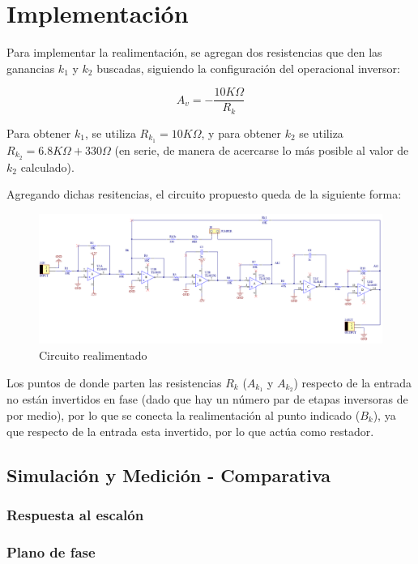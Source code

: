 \documentclass{article}
\begin{document}
\section{Implementación}

Para implementar la realimentación, se agregan dos resistencias que den las ganancias $k_1$ y $k_2$ buscadas, siguiendo la configuración del operacional inversor:

\[
A_v = -\frac{10K\Omega}{R_k} 
\] 

Para obtener $k_1$, se utiliza $R_{k_1} = 10K\Omega$, y para obtener $k_2$ se utiliza $R_{k_2} = 6.8K\Omega + 330\Omega$ (en serie, de manera de acercarse lo más posible al valor de $k_2$ calculado).

\newpage

Agregando dichas resitencias, el circuito propuesto queda de la siguiente forma:

\begin{figure}[H]
\centering
\includegraphics[width=1\linewidth]{Imagenes/CircuitoRealimentado.png}
\caption{Circuito realimentado}
\label{fig:Circuito}
\end{figure}

Los puntos de donde parten las resistencias $R_k$ ($A_{k_1}$ y $A_{k_2}$) respecto de la entrada no están invertidos en fase (dado que hay un número par de etapas inversoras de por medio), por lo que se conecta la realimentación al punto indicado ($B_k$), ya que respecto de la entrada esta invertido, por lo que actúa como restador.

\subsection{Simulación y Medición - Comparativa}

\subsubsection{Respuesta al escalón}

\subsubsection{Plano de fase}
\end{document}
